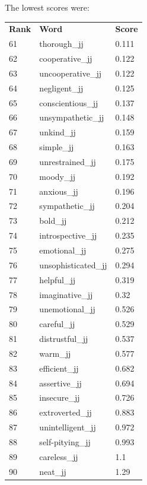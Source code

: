 \documentclass[10pt,letterpaper]{book}
\begin{document}
The lowest scores were:
\begin{tabular}{ l l l }
        \textbf{Rank} & \textbf{Word} & \textbf{Score} \\
        61 & thorough\_jj & 0.111 \\
        62 & cooperative\_jj & 0.122 \\
        63 & uncooperative\_jj & 0.122 \\
        64 & negligent\_jj & 0.125 \\
        65 & conscientious\_jj & 0.137 \\
        66 & unsympathetic\_jj & 0.148 \\
        67 & unkind\_jj & 0.159 \\
        68 & simple\_jj & 0.163 \\
        69 & unrestrained\_jj & 0.175 \\
        70 & moody\_jj & 0.192 \\
        71 & anxious\_jj & 0.196 \\
        72 & sympathetic\_jj & 0.204 \\
        73 & bold\_jj & 0.212 \\
        74 & introspective\_jj & 0.235 \\
        75 & emotional\_jj & 0.275 \\
        76 & unsophisticated\_jj & 0.294 \\
        77 & helpful\_jj & 0.319 \\
        78 & imaginative\_jj & 0.32 \\
        79 & unemotional\_jj & 0.526 \\
        80 & careful\_jj & 0.529 \\
        81 & distrustful\_jj & 0.537 \\
        82 & warm\_jj & 0.577 \\
        83 & efficient\_jj & 0.682 \\
        84 & assertive\_jj & 0.694 \\
        85 & insecure\_jj & 0.726 \\
        86 & extroverted\_jj & 0.883 \\
        87 & unintelligent\_jj & 0.972 \\
        88 & self-pitying\_jj & 0.993 \\
        89 & careless\_jj & 1.1 \\
        90 & neat\_jj & 1.29 \\
\end{tabular}
\end{document}

